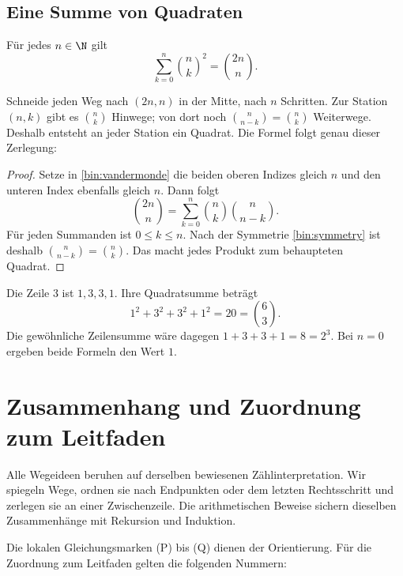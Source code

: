 \subsection*{Eine Summe von Quadraten}

\begin{satz}
Für jedes $n\in\N$ gilt
\begin{equation}\tag{Q}\label{bin:squares}
 \sum_{k=0}^n\binom nk^2=\binom{2n}n.
\end{equation}
\end{satz}
\Beweisidee Schneide jeden Weg nach $(2n,n)$ in der Mitte, nach $n$
Schritten. Zur Station $(n,k)$ gibt es $\binom nk$ Hinwege; von dort
noch $\binom n{n-k}=\binom nk$ Weiterwege. Deshalb entsteht an jeder
Station ein Quadrat. Die Formel folgt genau dieser Zerlegung:
\begin{proof}
Setze in \eqref{bin:vandermonde} die beiden oberen Indizes gleich $n$
und den unteren Index ebenfalls gleich $n$. Dann folgt
\[
 \binom{2n}n=\sum_{k=0}^n\binom nk\binom n{n-k}.
\]
Für jeden Summanden ist $0\le k\le n$. Nach der Symmetrie
\eqref{bin:symmetry} ist deshalb $\binom n{n-k}=\binom nk$.
Das macht jedes Produkt zum behaupteten Quadrat.
\end{proof}

\begin{beispiel}
Die Zeile $3$ ist $1,3,3,1$. Ihre Quadratsumme beträgt
\[
 1^2+3^2+3^2+1^2=20=\binom63.
\]
Die gewöhnliche Zeilensumme wäre dagegen $1+3+3+1=8=2^3$.
Bei $n=0$ ergeben beide Formeln den Wert $1$.
\end{beispiel}

\section{Zusammenhang und Zuordnung zum Leitfaden}
\label{bin:map}

Alle Wegeideen beruhen auf derselben bewiesenen Zählinterpretation.
Wir spiegeln Wege, ordnen sie nach Endpunkten oder dem letzten
Rechtsschritt und zerlegen sie an einer Zwischenzeile. Die arithmetischen
Beweise sichern dieselben Zusammenhänge mit Rekursion und Induktion.

Die lokalen Gleichungsmarken (P) bis (Q) dienen der Orientierung.
Für die Zuordnung zum Leitfaden gelten die folgenden Nummern:

